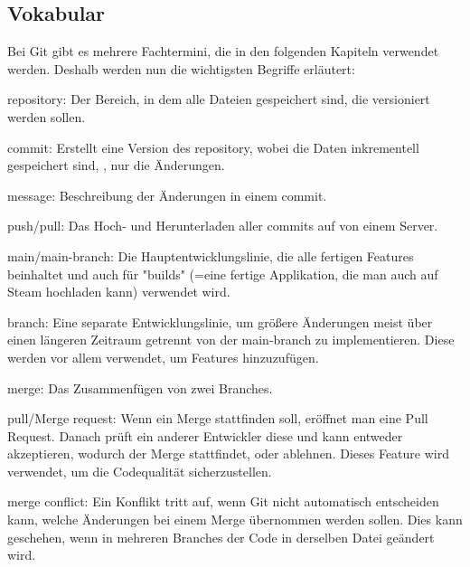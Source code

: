 \renewcommand{\kapitelautor}{Autor: Felix Zwickelstorfer}
\subsection{Vokabular}\label{subsec:git-vokabular}


\renewcommand{\kapitelautor}{Autor: Felix Zwickelstorfer}

Bei Git gibt es mehrere Fachtermini, die in den folgenden Kapiteln verwendet werden.
Deshalb werden nun die wichtigsten Begriffe erläutert:

\begin{liste}
    \item repository: Der Bereich, in dem alle Dateien gespeichert sind, die versioniert werden sollen.
    \item commit: Erstellt eine Version des repository, wobei die Daten inkrementell gespeichert sind, \dah, nur die Änderungen.
    \item message: Beschreibung der Änderungen in einem commit.
    \item push/pull: Das Hoch- und Herunterladen aller commits auf \bzw von einem Server.
    \item main/main-branch: Die Hauptentwicklungslinie, die alle fertigen Features beinhaltet und auch für "builds" (=eine fertige Applikation, die man auch auf Steam hochladen kann) verwendet wird.
    \item branch: Eine separate Entwicklungslinie, um größere Änderungen meist über einen längeren Zeitraum getrennt von der main-branch zu implementieren.
    Diese werden vor allem verwendet, um Features hinzuzufügen.
    \item merge: Das Zusammenfügen von zwei Branches.
    \item pull/Merge request: Wenn ein Merge stattfinden soll, eröffnet man eine Pull Request.
    Danach prüft ein anderer Entwickler diese und kann entweder akzeptieren, wodurch der Merge stattfindet, oder ablehnen.
    Dieses Feature wird verwendet, um die Codequalität sicherzustellen.
    \item merge conflict: Ein Konflikt tritt auf, wenn Git nicht automatisch entscheiden kann, welche Änderungen bei einem Merge übernommen werden sollen.
    Dies kann geschehen, wenn in mehreren Branches der Code in derselben Datei geändert wird.
\end{liste}
